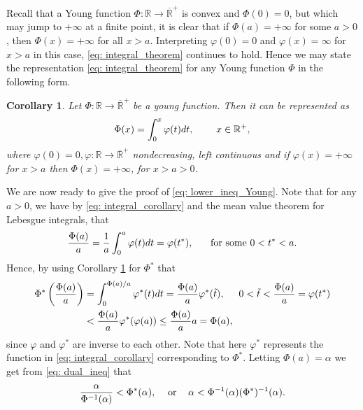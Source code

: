 \documentclass{article}
\newtheorem{cor}{Corollary}[theorem]
\theoremstyle{definition}
\begin{document}
Recall that a Young function $\Phi : \mathbb{R}\to \overline{\mathbb{R}}^+$ is convex and $\Phi(0) = 0$, but which may jump to $+\infty$ at a finite point, it is clear that if $\Phi(a) = +\infty$ for some $a > 0$, then $\Phi(x) = +\infty$ for all $x > a$. Interpreting $\varphi(0) = 0$ and $\varphi(x) = \infty$ for $x > a$ in this case, \eqref{eq: integral_theorem} continues to hold. Hence we may state the representation \eqref{eq: integral_theorem} for any Young function $\Phi$ in the following form.
\begin{cor}\label{cor: integral_form}
Let $\Phi : \mathbb{R}\to \overline{\mathbb{R}}^+$ be a young function. Then it can be represented as 
\begin{equation}\label{eq: integral_corollary}
\Phi(x)=\int_0^x\varphi(t)dt,\hspace{8mm} x\in \mathbb{R}^+,
\end{equation}
where $\varphi(0)=0, \varphi : \mathbb{R}\to \overline{\mathbb{R}}^+$ nondecreasing, left continuous and if $\varphi(x) = +\infty$ for $x > a$ then $\Phi(x) = +\infty$, for $x > a > 0$.
\end{cor}

We are now ready to give the proof of \eqref{eq: lower_ineq_Young}. Note that for any $a > 0$, we have by \eqref{eq: integral_corollary} and the mean value theorem for Lebesgue integrals, that
$$\frac{\Phi(a)}{a}=\frac{1}{a}\int_0^a\varphi(t)dt=\varphi(t^*), \hspace{5mm} \textup{ for some } 0<t^*<a. $$
Hence, by using Corollary \ref{cor: integral_form} for $\Phi^*$ that
\begin{equation}\label{eq: dual_ineq}
\begin{split}
\Phi^*\left(\frac{\Phi(a)}{a}\right)&=\int_0^{\Phi(a)/a}\varphi^*(t)dt=\frac{\Phi(a)}{a}\varphi^*(\tilde{t}), \hspace{5mm} 0<\tilde{t}<\frac{\Phi(a)}{a}=\varphi(t^*)\\
&<\frac{\Phi(a)}{a}\varphi^*(\varphi(a))\leq \frac{\Phi(a)}{a}a=\Phi(a),
\end{split}
\end{equation}
since $\varphi$ and $\varphi^*$ are inverse to each other. Note that here $\varphi^*$ represents the function in \eqref{eq: integral_corollary} corresponding to $\Phi^*$. Letting $\Phi(a) = \alpha$ we get from \eqref{eq: dual_ineq} that
$$\frac{\alpha}{\Phi^{-1}(\alpha)}<\Phi^*(\alpha), \hspace{3mm} \textup{ or } \hspace{3mm} \alpha<\Phi^{-1}(\alpha)(\Phi^*)^{-1}(\alpha).$$





\end{document}
